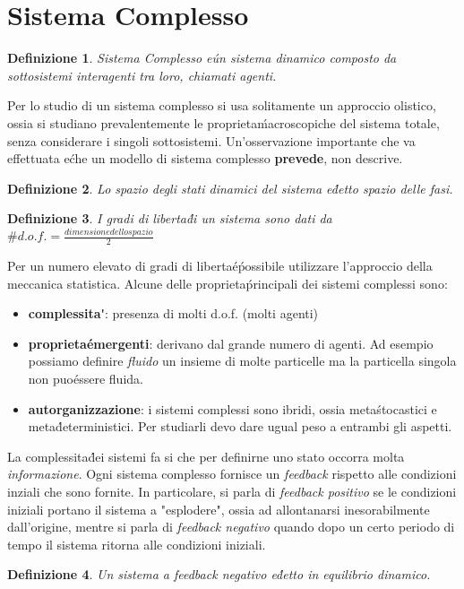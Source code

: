 \documentclass[12pt, a4paper]{book}
\theoremstyle{theorem}
\newtheorem{definition}{Definizione}[section]
\begin{document}
		\section{Sistema Complesso}
			\begin{definition}
				\textit{Sistema Complesso} e\' un sistema dinamico composto da sottosistemi interagenti tra loro, chiamati agenti.
			\end{definition}
			Per lo studio di un sistema complesso si usa solitamente un approccio olistico, ossia si studiano prevalentemente le proprieta\' macroscopiche del sistema totale, senza considerare i singoli sottosistemi.
			Un'osservazione importante che va effettuata e\' che un modello di sistema complesso \textbf{prevede}, non descrive.
			\begin{definition}
				Lo spazio degli stati dinamici del sistema e\' detto spazio delle fasi.
			\end{definition}
			\begin{definition}
				I gradi di liberta\' di un sistema sono dati da $\# d.o.f.=\frac{dimensione dello spazio}{2}$
			\end{definition}
			Per un numero elevato di gradi di liberta\' e\' possibile utilizzare l'approccio della meccanica statistica.
			Alcune delle proprieta\' principali dei sistemi complessi sono:
			\begin{itemize}
				\item \textbf{complessita\'}: presenza di molti d.o.f. (molti agenti)
				\item \textbf{proprieta\' emergenti}: derivano dal grande numero di agenti. Ad esempio possiamo definire \textit{fluido} un insieme di molte particelle ma la particella singola non puo\' essere fluida.
				\item \textbf{autorganizzazione}: i sistemi complessi sono ibridi, ossia meta\' stocastici e meta\' deterministici. Per studiarli devo dare ugual peso a entrambi gli aspetti.
			\end{itemize}
			La complessita\' dei sistemi fa si che per definirne uno stato occorra molta \emph{informazione}.
			Ogni sistema complesso fornisce un \emph{feedback} rispetto alle condizioni inziali che sono fornite.
			In particolare, si parla di \emph{feedback positivo} se le condizioni iniziali portano il sistema a "esplodere", ossia ad allontanarsi inesorabilmente dall'origine, mentre si parla di \emph{feedback negativo} quando dopo un certo periodo di tempo il sistema ritorna alle condizioni iniziali.
			\begin{definition}
				Un sistema a feedback negativo e\' detto in equilibrio dinamico.
			\end{definition}
		
\end{document}
